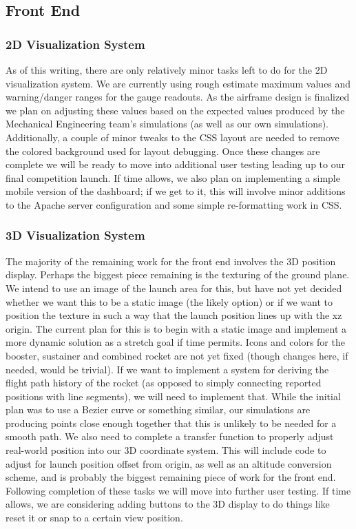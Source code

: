\documentclass[journal,10pt,onecolumn,compsoc]{IEEEtran}
\begin{document}
	\subsection{Front End}
	
		\subsubsection{2D Visualization System}
			As of this writing, there are only relatively minor tasks left to do for the 2D visualization system. 
			We are currently using rough estimate maximum values and warning/danger ranges for the gauge readouts. 
			As the airframe design is finalized we plan on adjusting these values based on the expected values produced by the Mechanical Engineering team's simulations (as well as our own simulations).
			Additionally, a couple of minor tweaks to the CSS layout are needed to remove the colored background used for layout debugging.
			Once these changes are complete we will be ready to move into additional user testing leading up to our final competition launch.
			If time allows, we also plan on implementing a simple mobile version of the dashboard; if we get to it, this will involve minor additions to the Apache server configuration and some simple re-formatting work in CSS.
		\subsubsection{3D Visualization System}
			The majority of the remaining work for the front end involves the 3D position display.
			Perhaps the biggest piece remaining is the texturing of the ground plane.
			We intend to use an image of the launch area for this, but have not yet decided whether we want this to be a static image (the likely option) or if we want to position the texture in such a way that the launch position lines up with the xz origin.
			The current plan for this is to begin with a static image and implement a more dynamic solution as a stretch goal if time permits.
			Icons and colors for the booster, sustainer and combined rocket are not yet fixed (though changes here, if needed, would be trivial).
			If we want to implement a system for deriving the flight path history of the rocket (as opposed to simply connecting reported positions with line segments), we will need to implement that.
			While the initial plan was to use a Bezier curve or something similar, our simulations are producing points close enough together that this is unlikely to be needed for a smooth path.
			We also need to complete a transfer function to properly adjust real-world position into our 3D coordinate system.
			This will include code to adjust for launch position offset from origin, as well as an altitude conversion scheme, and is probably the biggest remaining piece of work for the front end.
			Following completion of these tasks we will move into further user testing.
			If time allows, we are considering adding buttons to the 3D display to do things like reset it or snap to a certain view position.
\end{document}
